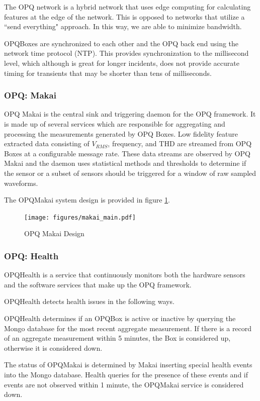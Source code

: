 The OPQ network is a hybrid network that uses edge computing for calculating features at the edge of the network. This is opposed to networks that utilize a ``send everything" approach. In this way, we are able to minimize bandwidth. 

OPQBoxes are synchronized to each other and the OPQ back end using the network time protocol (NTP). This provides synchronization to the millisecond level, which although is great for longer incidents, does not provide accurate timing for transients that may be shorter than tens of milliseconds.


\subsubsection{OPQ: Makai}
OPQ Makai is the central sink and triggering daemon for the OPQ framework. It is made up of several services which are responsible for aggregating and processing the measurements generated by OPQ Boxes. Low fidelity feature extracted data consisting of $V_{RMS}$, frequency, and THD are streamed from OPQ Boxes at a configurable message rate. These data streams are observed by OPQ Makai and the daemon uses statistical methods and thresholds to determine if the sensor or a subset of sensors should be triggered for a window of raw sampled waveforms. 

The OPQMakai system design is provided in figure \ref{fig:makai-main}.

\begin{figure}
	\centering
	\texttt{[image: figures/makai\_main.pdf]}
	\caption{OPQ Makai Design}\label{fig:makai-main}
\end{figure}

\subsubsection{OPQ: Health}
OPQHealth is a service that continuously monitors both the hardware sensors and the software services that make up the OPQ framework.

OPQHealth detects health issues in the following ways. 

OPQHealth determines if an OPQBox is active or inactive by querying the Mongo database for the most recent aggregate measurement. If there is a record of an aggregate measurement within 5 minutes, the Box is considered up, otherwise it is considered down.

The status of OPQMakai is determined by Makai inserting special health events into the Mongo database. Health queries for the presence of these events and if events are not observed within 1 minute, the OPQMakai service is considered down.

